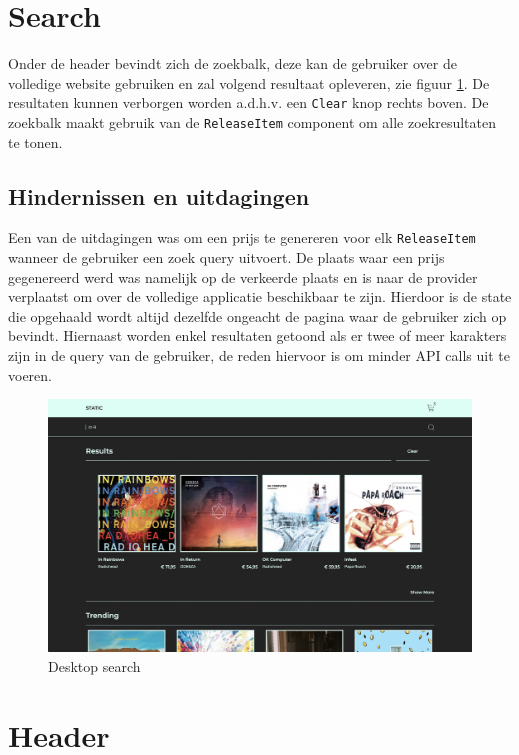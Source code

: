\section{Search}

Onder de header bevindt zich de zoekbalk, deze kan de gebruiker over de volledige website gebruiken en zal volgend resultaat opleveren, zie figuur \ref{fig:desktopSearch}. De resultaten kunnen verborgen worden a.d.h.v. een \texttt{Clear} knop rechts boven. De zoekbalk maakt gebruik van de \texttt{ReleaseItem} component om alle zoekresultaten te tonen.

\subsection{Hindernissen en uitdagingen}

Een van de uitdagingen was om een prijs te genereren voor elk \texttt{ReleaseItem} wanneer de gebruiker een zoek query uitvoert. De plaats waar een prijs gegenereerd werd was namelijk op de verkeerde plaats en is naar de provider verplaatst om over de volledige applicatie beschikbaar te zijn. Hierdoor is de state die opgehaald wordt altijd dezelfde ongeacht de pagina waar de gebruiker zich op bevindt. Hiernaast worden enkel resultaten getoond als er twee of meer karakters zijn in de query van de gebruiker, de reden hiervoor is om minder API calls uit te voeren.

\begin{figure}[h]
	\centering
	\includegraphics[width=1\linewidth]{graphics/desktopSearch}
	\caption[Desktop search]{Desktop search}
	\label{fig:desktopSearch}
\end{figure}

\section{Header}

